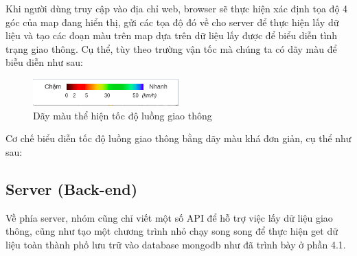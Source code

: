 Khi người dùng truy cập vào địa chỉ web, browser sẽ thực hiện xác định tọa độ 4 góc của map đang hiển thị, gửi các tọa độ đó về cho server để thực hiện lấy dữ liệu và tạo các đoạn màu trên map dựa trên dữ liệu lấy được để biểu diễn tình trạng giao thông. Cụ thể, tùy theo trường vận tốc mà chúng ta có dãy màu để biễu diễn như sau:

\begin{figure}[!ht]
	\begin{center}
		\includegraphics[width=0.5\textwidth]{Traffic_Report/images/color.png}
	\end{center}
	\caption{Dãy màu thể hiện tốc độ luồng giao thông}
\end{figure}

Cơ chế biểu diễn tốc độ luồng giao thông bằng dãy màu khá đơn giản, cụ thể như sau:
\subsection{Server (Back-end)}
Về phía server, nhóm cũng chỉ viết một số API để hỗ trợ việc lấy dữ liệu giao thông, cũng như tạo một chương trình nhỏ chạy song song để thực hiện get dữ liệu toàn thành phố lưu trữ vào database mongodb như đã trình bày ở phần 4.1.

